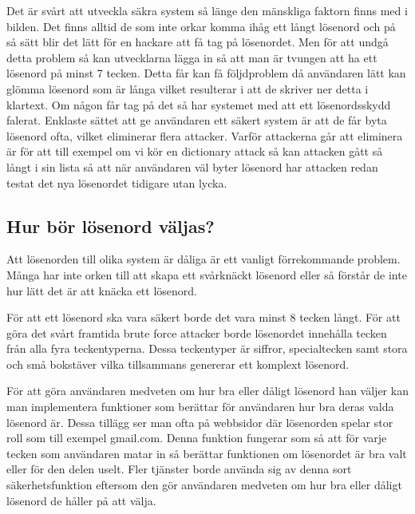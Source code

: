 Det är svårt att utveckla säkra system så länge den mänskliga faktorn finns med i bilden. Det finns alltid de som inte orkar komma ihåg ett långt lösenord och på så sätt blir det lätt för en hackare att få tag på lösenordet. Men för att undgå detta problem så kan utvecklarna lägga in så att man är tvungen att ha ett lösenord på minst 7 tecken. Detta får kan få följdproblem då användaren lätt kan glömma lösenord som är långa vilket resulterar i att de skriver ner detta i klartext. Om någon får tag på det så har systemet med att ett lösenordsskydd falerat. Enklaste sättet att ge användaren ett säkert system är att de får byta lösenord ofta, vilket eliminerar flera attacker. Varför attackerna går att eliminera är för att till exempel om vi kör en dictionary attack så kan attacken gått så långt i sin lista så att när användaren väl byter lösenord har attacken redan testat det nya lösenordet tidigare utan lycka. 

\subsection{Hur bör lösenord väljas?}

Att lösenorden till olika system är dåliga är ett vanligt förrekommande problem. Många har inte orken till att skapa ett svårknäckt lösenord eller så förstår de inte hur lätt det är att knäcka ett lösenord. 

För att ett lösenord ska vara säkert borde det vara minst 8 tecken långt. För att göra det svårt framtida brute force attacker borde lösenordet innehålla tecken från alla fyra teckentyperna. Dessa teckentyper är siffror, specialtecken samt stora och små bokstäver vilka tillsammans genererar ett komplext lösenord. 

För att göra användaren medveten om hur bra eller dåligt lösenord han väljer kan man implementera funktioner som berättar för användaren hur bra deras valda lösenord är. Dessa tillägg ser man ofta på webbsidor där lösenorden spelar stor roll som till exempel gmail.com. Denna funktion fungerar som så att för varje tecken som användaren matar in så berättar funktionen om lösenordet är bra valt eller för den delen uselt. Fler tjänster borde använda sig av denna sort säkerhetsfunktion eftersom den gör användaren medveten om hur bra eller dåligt lösenord de håller på att välja.